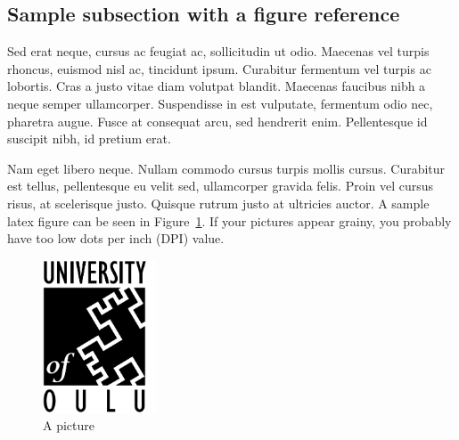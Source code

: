 \subsection{Sample subsection with a figure reference}

Sed erat neque, cursus ac feugiat ac, sollicitudin
ut odio. Maecenas vel turpis rhoncus, euismod nisl ac, tincidunt ipsum. Curabitur fermentum vel
turpis ac lobortis. Cras a justo vitae diam volutpat blandit. Maecenas faucibus nibh a neque 
semper ullamcorper. Suspendisse in est vulputate, fermentum odio nec, pharetra augue. Fusce at
consequat arcu, sed hendrerit enim. Pellentesque id suscipit nibh, id pretium erat. 

Nam eget libero neque. Nullam commodo cursus turpis mollis cursus. Curabitur est tellus,
pellentesque eu velit sed, ullamcorper gravida felis. Proin vel cursus risus, at scelerisque 
justo. Quisque rutrum justo at ultricies auctor. A sample latex figure can be seen in
Figure~\ref{fig:oylogoe}. If your pictures appear grainy, you probably have too low dots
per inch (DPI) value.


\begin{figure}[ht]
  \begin{center}
    \includegraphics*[width=0.3\textwidth]{oylogoe}
  \end{center}
  \caption{A picture}
  \label{fig:oylogoe}
\end{figure}

